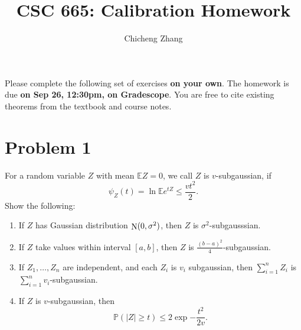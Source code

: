 \documentclass{article}
\title{CSC 665: Calibration Homework}
\author{Chicheng Zhang}
\DeclareMathOperator*{\N}{{\rm N}}
\newcommand{\EE}{\mathbb{E}} %
\newcommand{\PP}{\mathbb{P}} %
\begin{document}
\maketitle

Please complete the following set of exercises \textbf{on your own}.
The homework is due \textbf{on Sep 26, 12:30pm, on Gradescope}. You are free to
cite existing theorems from the textbook and course notes.

\section*{Problem 1}
For a random variable $Z$ with mean $\EE Z = 0$, we call $Z$ is $v$-subgaussian, if
\[ \psi_Z(t) = \ln \EE e^{t Z} \leq \frac{v t^2}{2}. \]
Show the following:
\begin{enumerate}
\item If $Z$ has Gaussian distribution $\N(0,\sigma^2)$, then $Z$ is
$\sigma^2$-subgausssian.
\item If $Z$ take values within interval $[a,b]$, then $Z$ is
$\frac{(b-a)^2}{4}$-subgaussian.
\item If $Z_1,\ldots,Z_n$ are independent, and each $Z_i$ is $v_i$ subgaussian, then
$\sum_{i=1}^n Z_i$ is $\sum_{i=1}^n v_i$-subgaussian.
\item If $Z$ is $v$-subgaussian, then
\[ \PP(|Z| \geq t) \leq 2 \exp{-\frac{t^2}{2v}}. \]
\end{enumerate}
\end{document}
